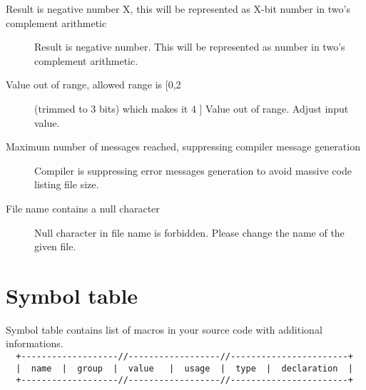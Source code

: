 \begin{description}
            \item[Result is negative number X, this will be represented as X-bit number in two's complement arithmetic]
                Result is negative number. This will be represented as number in two's complement arithmetic.
            \item[Value out of range, allowed range is [0,2] (trimmed to 3 bits) which makes it 4 ]
                Value out of range. Adjust input value.
            \item[Maximum number of messages reached, suppressing compiler message generation ]
                Compiler is suppressing error messages generation to avoid massive code listing file size.
            \item[File name contains a null character ]
                Null character in file name is forbidden. Please change the name of the given file.
        \end{description}

\section{Symbol table}
    Symbol table contains list of macros in your source code with additional informations.\\
    {
        \usecodefont
        \verb'  +-------------------//------------------//-----------------------+'\\
        \verb'  |  name  |  group  |  value   |  usage  |  type  |  declaration  |'\\
        \verb'  +-------------------//------------------//-----------------------+'\\
    }

